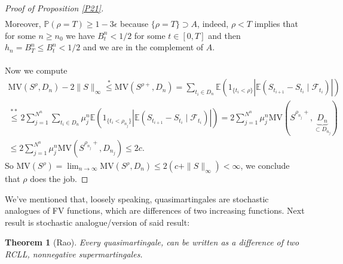 \documentclass[12pt,a4paper, twoside]{article}
\newtheorem{thm}{Theorem}[section]
\theoremstyle{definition}
\newcommand{\EE}{\mathbb{E}} %
\newcommand{\PP}{\mathbb{P}} %
\newcommand{\MV}{\text{MV}}
\begin{document}
\begin{proof}[Proof of Proposition \ref{P21}]
\begin{align*}
\end{align*}
Moreover, $\PP( \rho = T) \geq 1- 3 \epsilon$ because $\{ \rho = T\} \supset A$, indeed, $\rho < T$ implies that for some $n \geq n_0$ we have $B_t^n < 1/2$ for some $t \in [0,T]$ and then $h_n= B_T^n \leq B_t^n < 1/2$ and we are in the complement of $A$. \\
\\
Now we compute 
\begin{align*}
\MV(S^\rho, D_n) -2 \|S\|_\infty \overset{*}\leq \MV(S^{\rho+}, D_n) = \sum_{t_i \in D_n} \EE(1_{\{t_i < \rho\}} | \EE(S_{t_{i+1}}-S_{t_i} \mid \mathcal{F}_{t_i})|) \\
\overset{**}\leq 2 \sum_{j=1}^{N^n} \sum_{t_i \in D_n} \mu_j^n \EE(1_{\{t_i < \rho_{n_j}\}} | \EE(S_{t_{i+1}}-S_{t_i} \mid \mathcal{F}_{t_i})|) = 2 \sum_{j=1}^{N^n} \mu_j^n \MV(S^{\rho_{n_j}+}, \underbrace{D_n}_{\subset D_{n_j}}) \\
\leq 2 \sum_{j=1}^{N^n} \mu_j^n \MV(S^{\rho_{n_j}+}, D_{n_j}) \leq 2 c.
\end{align*}
So $\MV(S^\rho)= \lim_{n \to \infty} \MV(S^\rho, D_n) \leq 2 (c + \|S\|_\infty) < \infty$, we conclude that $\rho$ does the job. 
\end{proof}
\newpage
We've mentioned that, loosely speaking, quasimartingales are stochastic analogues of FV functions, which are differences of two increasing functions. Next result is stochastic analogue/version of said result: 
\begin{thm}[Rao] \label{T23} Every quasimartingale, can be written as a difference of two RCLL, nonnegative supermartingales. 
\end{thm}
\end{document}
